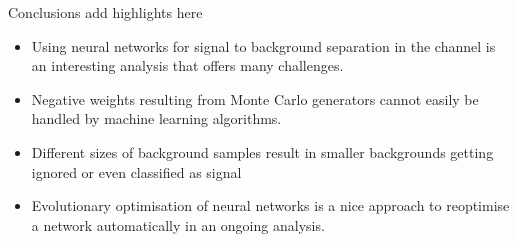 \begin{frame}{Conclusions}
    add highlights here
    \begin{itemize}
        \item Using neural networks for signal to background separation in the \tHq channel is an interesting analysis that offers many challenges.
        \item Negative weights resulting from Monte Carlo generators cannot easily be handled by machine learning algorithms.
        \item Different sizes of background samples result in smaller backgrounds getting ignored or even classified as signal
        \item Evolutionary optimisation of neural networks is a nice approach to reoptimise a network automatically in an ongoing analysis.
    \end{itemize}
\end{frame}